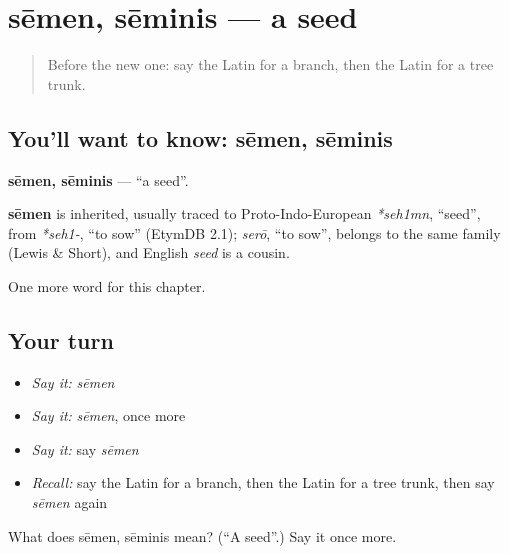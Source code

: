 \section[sēmen, sēminis]{sēmen, sēminis — a seed}

\label{lesson:LA-C129-semen}



\begin{quote}
Before the new one: say the Latin for a branch, then the Latin for a tree trunk.
\end{quote}

\subsection*{You'll want to know: sēmen, sēminis}
\textbf{sēmen, sēminis} — \textquotedblleft{}a seed\textquotedblright{}.

\begin{cousinweb}
\textbf{sēmen} is inherited, usually traced to Proto-Indo-European \emph{*seh1mn}, \textquotedblleft{}seed\textquotedblright{}, from \emph{*seh1-}, \textquotedblleft{}to sow\textquotedblright{} (EtymDB 2.1); \emph{serō}, \textquotedblleft{}to sow\textquotedblright{}, belongs to the same family (Lewis \& Short), and English \emph{seed} is a cousin.
\end{cousinweb}

\begin{grammarlens}[title={What you've built}]
One more word for this chapter.
\end{grammarlens}

\subsection*{Your turn}
\begin{itemize}
\raggedright
  \item \emph{Say it:} \emph{sēmen}
  \item \emph{Say it:} \emph{sēmen}, once more
  \item \emph{Say it:} say \emph{sēmen}
  \item \emph{Recall:} say the Latin for a branch, then the Latin for a tree trunk, then say \emph{sēmen} again
\end{itemize}

\begin{tcolorbox}[breakable,colback=teal!4,colframe=teal!35!black,title={Before you move on}]
What does sēmen, sēminis mean? (\textquotedblleft{}A seed\textquotedblright{}.) Say it once more.
\end{tcolorbox}
